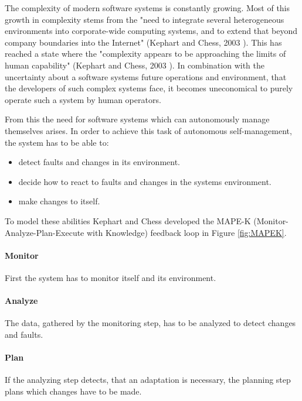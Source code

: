 The complexity of modern software systems is constantly growing.
Most of this growth in complexity stems from the
"need to integrate several heterogeneous environments into corporate-wide computing systems, 
and to extend that beyond company boundaries into the Internet" (Kephart and Chess, 2003 \cite*{VisionOfAutonomicComputing}).
This has reached a state where the 
"complexity appears to be approaching the limits of human capability" (Kephart and Chess, 2003 \cite*{VisionOfAutonomicComputing}).
In combination with the uncertainty about a software systems future operations and environment,
that the developers of such complex systems face, it becomes uneconomical to purely operate such a system by human operators.
\newline
\par


From this the need for software systems which can autonomously manage themselves arises.
In order to achieve this task of autonomous self-management, the system has to be able to:
\begin{itemize}
    \item detect faults and changes in its environment.
    \item decide how to react to faults and changes in the systems environment.
    \item make changes to itself.
\end{itemize}

To model these abilities Kephart and Chess developed
the MAPE-K (Monitor-Analyze-Plan-Execute with Knowledge) feedback loop \cite*{VisionOfAutonomicComputing} in Figure \ref{fig:MAPEK}.
\paragraph*{Monitor} First the system has to monitor itself and its environment. 
\paragraph*{Analyze} The data, gathered by the monitoring step, has to be analyzed to detect changes and faults.
\paragraph*{Plan} If the analyzing step detects, that an adaptation is necessary, 
the planning step plans which changes have to be made.
